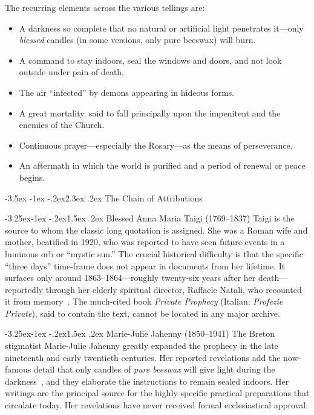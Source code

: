 \documentclass[11pt]{article}
\makeatletter
\renewcommand\section{\@startsection{section}{1}{\z@}%
  {-3.5ex \@plus -1ex \@minus -.2ex}{2.3ex \@plus.2ex}%
  {\normalfont\Large\bfseries\color{accent}}}
\renewcommand\subsection{\@startsection{subsection}{2}{\z@}%
  {-3.25ex\@plus -1ex \@minus -.2ex}{1.5ex \@plus .2ex}%
  {\normalfont\large\bfseries\color{accent}}}
\makeatother
\begin{document}
The recurring elements across the various tellings are:

\begin{itemize}
  \item A darkness so complete that no natural or artificial light penetrates
        it---only \emph{blessed} candles (in some versions, only pure beeswax)
        will burn.
  \item A command to stay indoors, seal the windows and doors, and not look
        outside under pain of death.
  \item The air ``infected'' by demons appearing in hideous forms.
  \item A great mortality, said to fall principally upon the impenitent and
        the enemies of the Church.
  \item Continuous prayer---especially the Rosary---as the means of perseverance.
  \item An aftermath in which the world is purified and a period of renewal or
        peace begins.
\end{itemize}

\section{The Chain of Attributions}

\subsection{Blessed Anna Maria Taigi (1769--1837)}
Taigi is the source to whom the classic long quotation is assigned. She was a
Roman wife and mother, beatified in 1920, who was reported to have seen future
events in a luminous orb or ``mystic sun.'' The crucial historical difficulty
is that the specific ``three days'' time-frame does not appear in documents
from her lifetime. It surfaces only around 1863--1864---roughly
twenty-six years after her death---reportedly through her elderly spiritual
director, Raffaele Natali, who recounted it from memory~\cite{ermitano}. The much-cited book
\emph{Private Prophecy} (Italian: \emph{Profezie Private}), said to contain the
text, cannot be located in any major archive.

\subsection{Marie-Julie Jahenny (1850--1941)}
The Breton stigmatist Marie-Julie Jahenny greatly expanded the prophecy in
the late nineteenth and early twentieth centuries. Her reported revelations
add the now-famous detail that only candles of \emph{pure beeswax} will give
light during the darkness~\cite{jahenny}, and they elaborate the instructions to remain
sealed indoors. Her writings are the principal source for the highly specific
practical preparations that circulate today. Her revelations have never
received formal ecclesiastical approval.
\end{document}
